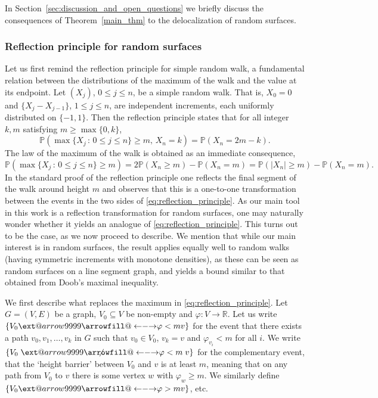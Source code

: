 \documentclass[english]{article}
\makeatletter
\newcommand\xleftrightarrow[2][]{%
  \ext@arrow 9999{\longleftrightarrowfill@}{#1}{#2}}
\newcommand\longleftrightarrowfill@{%
  \arrowfill@\leftarrow\relbar\rightarrow}
\theoremstyle{plain}
\theoremstyle{plain}
\makeatother
\begin{document}
In Section~\ref{sec:discussion_and_open_questions} we briefly discuss the consequences of Theorem~\ref{main_thm} to
the delocalization of random surfaces.

\subsubsection{Reflection principle for random surfaces}
Let us first remind the reflection principle for simple random walk,
a fundamental relation between the distributions of the maximum of
the walk and the value at its endpoint. Let $(X_j)$, $0\le j\le n$,
be a simple random walk. That is, $X_0=0$ and $\{X_j-X_{j-1}\}$,
$1\le j\le n$, are independent increments, each uniformly
distributed on $\{-1,1\}$. Then the reflection principle states that
for all integer $k,m$ satisfying $m\ge\max\{0,k\}$,
\begin{equation}\label{eq:reflection_principle}
  \mathbb{P}(\max\{X_j\,:\,0\le j\le n\}\ge m,\, X_n=k) = \mathbb{P}(X_n = 2m-k).
\end{equation}
The law of the maximum of the walk is obtained as an immediate
consequence,
\begin{equation}\label{eq:maximum_of_walk}
  \mathbb{P}(\max\{X_j\,:\,0\le j\le n\}\ge m) = 2\mathbb{P}(X_n \ge m) - \mathbb{P}(X_n = m) = \mathbb{P}(|X_n|\ge m) - \mathbb{P}(X_n = m).
\end{equation}
In the standard proof of the reflection principle one reflects the
final segment of the walk around height $m$ and observes that this
is a one-to-one transformation between the events in the two sides
of \eqref{eq:reflection_principle}. As our main tool in this work is
a reflection transformation for random surfaces, one may naturally
wonder whether it yields an analogue of
\eqref{eq:reflection_principle}. This turns out to be the case, as
we now proceed to describe. We mention that while our main interest
is in random surfaces, the result applies equally well to random
walks (having symmetric increments with monotone densities), as
these can be seen as random surfaces on a line segment graph, and
yields a bound similar to that obtained from Doob's maximal
inequality.

We first describe what replaces the maximum in
\eqref{eq:reflection_principle}. Let $G=(V,E)$ be a graph,
$V_0\subseteq V$ be non-empty and $\varphi:V\to \mathbb{R}$. Let us
write $\{V_0 \xleftrightarrow{\varphi< m} v\}$ for the event that
there exists a path $v_0, v_1, \ldots, v_k$ in $G$ such that $v_0\in
V_0$, $v_k = v$ and $\varphi_{v_i}< m$ for all $i$. We write $\{V_0
\centernot{\xleftrightarrow{\varphi< m}} v\}$ for the complementary
event, that the `height barrier' between $V_0$ and $v$ is at least
$m$, meaning that on any path from $V_0$ to $v$ there is some vertex
$w$ with $\varphi_w\ge m$. We similarly define $\{V_0
\xleftrightarrow{\varphi>m} v\}$, etc.
\end{document}
